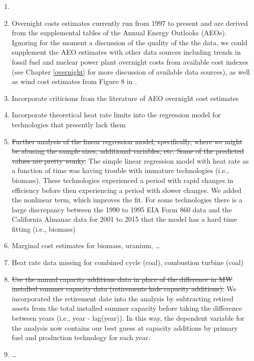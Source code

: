 \documentclass[10pt]{report}
\begin{document}
\begin{enumerate}
\item 
\item Overnight costs estimates currently run from 1997 to present and are derived from the supplemental tables of the Annual Energy Outlooks (AEOs). 
Ignoring for the moment a discussion of the quality of the the data, we could supplement the AEO estimates with other data sources including trends in fossil fuel and nuclear power plant overnight costs from available cost indexes (see Chapter \ref{overnight} for more discussion of available data sources), as well as wind cost estimates from Figure 8 in \cite{bolinger2009wind}. 
\item Incorporate criticisms from the literature of AEO overnight cost estimates 
\item Incorporate theoretical heat rate limits into the regression model for technologies that presently lack them
\item \sout{Further analysis of the linear regression model, specifically, where we might be abusing the sample sizes, additional variables, etc.
Some of the predicted values are pretty wonky.} 
\begingroup
\color{red} 
The simple linear regression model with heat rate as a function of time was having trouble with immature technologies (i.e., biomass).
These technologies experienced a period with rapid changes in efficiency before then experiencing a period with slower changes.  
We added the nonlinear term, which improves the fit. 
For some technologies there is a large discrepancy between the 1990 to 1995 EIA Form 860 data and the California Almanac data for 2001 to 2015 that the model has a hard time fitting (i.e., biomass)
\endgroup
\item Marginal cost estimates for biomass, uranium, \ldots
\item Heat rate data missing for combined cycle (coal), combustion turbine (coal) 
\item \sout{Use the annual capacity additions data in place of the difference in MW installed summer capacity data (retirements hide capacity additions).}
\begingroup
\color{red}
We incorporated the retirement date into the analysis by subtracting retired assets from the total installed summer capacity before taking the difference between years (i.e., year - lag(year)). 
In this way, the dependent variable for the analysis now contains our best guess at capacity additions by primary fuel and production technology for each year. 
\endgroup
\item \ldots
\end{enumerate}
\end{document}
